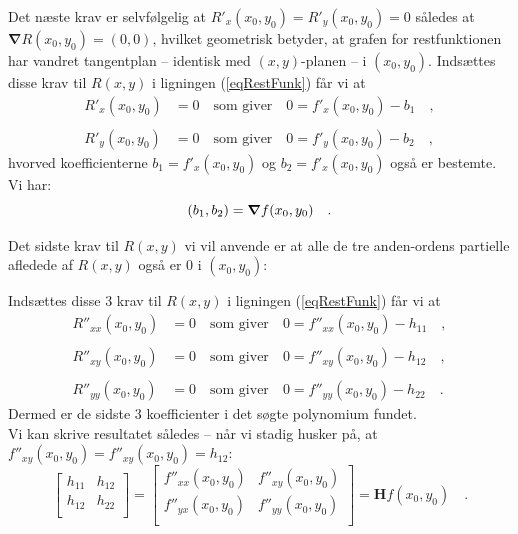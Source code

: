 Det næste krav er selvfølgelig at $R'_{x}(x_{0}, y_{0}) = R'_{y}(x_{0}, y_{0}) = 0$ således at $\bm{\nabla}R(x_{0}, y_{0}) = (0,0)$, hvilket geometrisk betyder, at grafen for restfunktionen har vandret tangentplan -- identisk med $(x,y)$-planen -- i $(x_{0}, y_{0})$.
Indsættes disse krav til $R(x,y)$ i ligningen (\ref{eqRestFunk}) får vi at
\begin{equation}
\begin{aligned}
R'_{x}(x_{0}, y_{0}) &= 0 \quad \textrm{som giver} \quad 0 = f'_{x}(x_{0}, y_{0}) - b_{1} \quad, \\ \\
R'_{y}(x_{0}, y_{0}) &= 0 \quad \textrm{som giver} \quad 0 = f'_{y}(x_{0}, y_{0}) - b_{2} \quad,
\end{aligned}
\end{equation}
hvorved koefficienterne $b_{1} = f'_{x}(x_{0}, y_{0})$ og $b_{2} = f'_{x}(x_{0}, y_{0})$ også er bestemte. Vi har:
\begin{equation}
(b_{1}, b_{2}) = \bm{\nabla}f(x_{0}, y_{0}) \quad.\\
\end{equation}

Det sidste krav til $R(x,y)$ vi vil anvende er at alle de tre anden-ordens partielle afledede af $R(x,y)$ også er $0$ i $(x_{0}, y_{0})$:

Indsættes disse $3$ krav til $R(x,y)$ i ligningen (\ref{eqRestFunk}) får vi at
\begin{equation}
\begin{aligned}
R''_{xx}(x_{0}, y_{0}) &= 0 \quad \textrm{som giver} \quad 0 = f''_{xx}(x_{0}, y_{0}) - h_{11} \quad, \\ \\
R''_{xy}(x_{0}, y_{0}) &= 0 \quad \textrm{som giver} \quad 0 = f''_{xy}(x_{0}, y_{0}) - h_{12} \quad, \\ \\
R''_{yy}(x_{0}, y_{0}) &= 0 \quad \textrm{som giver} \quad 0 = f''_{yy}(x_{0}, y_{0}) - h_{22} \quad.
\end{aligned}
\end{equation}
Dermed er de sidste $3$ koefficienter i det søgte polynomium fundet. \\

Vi kan skrive resultatet således -- når vi stadig husker på, at $f''_{xy}(x_{0}, y_{0}) = f''_{xy}(x_{0}, y_{0}) = h_{12}$:
\begin{equation}
\left[
  \begin{array}{cc}
    h_{11} & h_{12} \\
    h_{12} & h_{22}\\
  \end{array}
\right] = \left[
  \begin{array}{cc}
    f''_{xx}(x_{0}, y_{0}) & f''_{xy}(x_{0}, y_{0}) \\
    f''_{yx}(x_{0}, y_{0}) & f''_{yy}(x_{0}, y_{0})\\
  \end{array}
\right] = \mathbf{H}f(x_{0}, y_{0}) \quad .
\end{equation}

